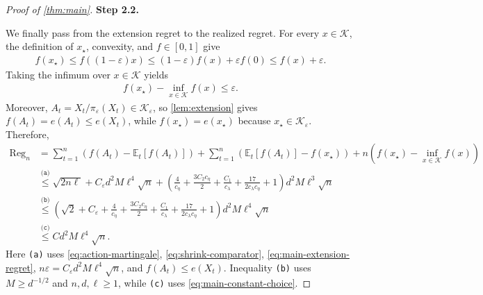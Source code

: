 \documentclass[11pt]{article}
\newcommand{\proofstepinline}[1]{%
    {\sffamily\bfseries\color{blue!55!black}Step #1.}\enspace
}
\newcommand{\E}{\mathbb E}
\newcommand{\K}{\mathcal K}
\newcommand{\1}{\mathbf 1}
\newcommand{\eps}{\varepsilon}
\begin{document}
\begin{proof}[Proof of \cref{thm:main}]
    \proofstepinline{2.2}
    We finally pass from the extension regret to the realized regret.
    For every $x\in\K$, the definition of $x_\star$, convexity, and
    $f\in[0,1]$ give
    \begin{align}
        f(x_\star)
        \leq f((1-\eps)x)
        \leq(1-\eps)f(x)+\eps f(0)
        \leq f(x)+\eps.
    \end{align}
    Taking the infimum over $x\in\K$ yields
    \begin{align}
        f(x_\star)-\inf_{x\in\K}f(x)\leq\eps.
        \label{eq:shrink-comparator}
    \end{align}
    Moreover, $A_t=X_t/\pi_\eps(X_t)\in\K_\eps$, so
    \cref{lem:extension} gives $f(A_t)=e(A_t)\leq e(X_t)$, while
    $f(x_\star)=e(x_\star)$ because $x_\star\in\K_\eps$.
    Therefore,
    \begin{align}
        \operatorname{Reg}_n
         & =
        \sum_{t=1}^n
        \left(f(A_t)-\E_t[f(A_t)]\right)
        +\sum_{t=1}^n
        \left(\E_t[f(A_t)]-f(x_\star)\right)
        +n\left(f(x_\star)-\inf_{x\in\K}f(x)\right)
        \nonumber                        \\
         & \stackrel{\texttt{(a)}}{\leq}
        \sqrt{2n\ell}
        +C_\eps d^2M\ell^4\sqrt n
        +\left(
        \frac4{c_\eta}
        +\frac{3C_2c_\eta}{2}
        +\frac{C_1}{c_\lambda}
        +\frac{17}{2c_\lambda c_\eta}
        +1
        \right)d^2M\ell^3\sqrt n
        \nonumber                        \\
         & \stackrel{\texttt{(b)}}{\leq}
        \left(
        \sqrt2+C_\eps
        +\frac4{c_\eta}
        +\frac{3C_2c_\eta}{2}
        +\frac{C_1}{c_\lambda}
        +\frac{17}{2c_\lambda c_\eta}
        +1
        \right)d^2M\ell^4\sqrt n
        \nonumber                        \\
         & \stackrel{\texttt{(c)}}{\leq}
        C d^2M\ell^4\sqrt n.
    \end{align}
    Here \texttt{(a)} uses \eqref{eq:action-martingale},
    \eqref{eq:shrink-comparator}, \eqref{eq:main-extension-regret},
    $n\eps=C_\eps d^2M\ell^4\sqrt n$, and
    $f(A_t)\leq e(X_t)$.
    Inequality \texttt{(b)} uses
    $M\geq d^{-1/2}$ and $n,d,\ell\geq1$, while
    \texttt{(c)} uses \eqref{eq:main-constant-choice}.
\end{proof}
\end{document}
